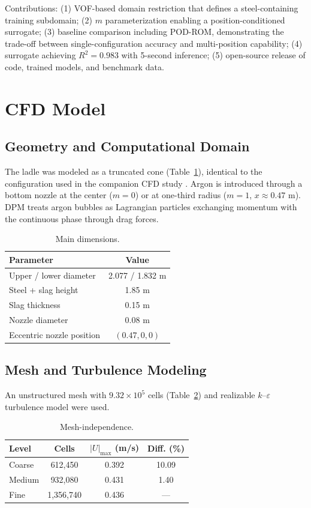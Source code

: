 \documentclass[12pt,a4paper]{article}
\begin{document}
Contributions: (1) VOF-based domain restriction that defines a steel-containing training subdomain; (2) $m$ parameterization enabling a position-conditioned surrogate; (3) baseline comparison including POD-ROM, demonstrating the trade-off between single-configuration accuracy and multi-position capability; (4) surrogate achieving $R^{2}=0.983$ with 5-second inference; (5) open-source release of code, trained models, and benchmark data.

\section{CFD Model}

\subsection{Geometry and Computational Domain}
The ladle was modeled as a truncated cone (Table~\ref{tab:geometry}), identical to the configuration used in the companion CFD study \cite{liu2026cfd}. Argon is introduced through a bottom nozzle at the center ($m=0$) or at one-third radius ($m=1$, $x\approx 0.47$ m). DPM treats argon bubbles as Lagrangian particles exchanging momentum with the continuous phase through drag forces.

\begin{table}[h]
\centering
\caption{Main dimensions.}
\label{tab:geometry}
\begin{tabular}{lc}
\toprule Parameter & Value \\ \midrule
Upper / lower diameter & 2.077 / 1.832 m \\
Steel + slag height & 1.85 m \\
Slag thickness & 0.15 m \\
Nozzle diameter & 0.08 m \\
Eccentric nozzle position & $(0.47, 0, 0)$ \\
\bottomrule
\end{tabular}
\end{table}

\subsection{Mesh and Turbulence Modeling}
An unstructured mesh with $9.32\times 10^{5}$ cells (Table~\ref{tab:mesh}) and realizable $k$--$\varepsilon$ turbulence model \cite{shih1995new} were used.

\begin{table}[h]
\centering
\caption{Mesh-independence.}
\label{tab:mesh}
\begin{tabular}{lccc}
\toprule Level & Cells & $|U|_{\max}$ (m/s) & Diff. (\%) \\ \midrule
Coarse  & 612,450  & 0.392 & 10.09 \\
Medium  & 932,080  & 0.431 & 1.40 \\
Fine    & 1,356,740 & 0.436 & --- \\
\bottomrule
\end{tabular}
\end{table}
\end{document}
